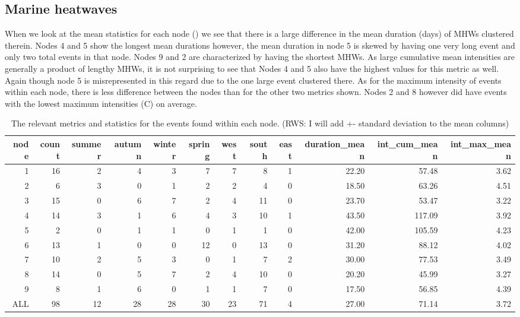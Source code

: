 \documentclass[a4paper,10pt,review]{elsarticle}
\begin{document}
\subsection{Marine heatwaves}
When we look at the mean statistics for each node () we see that there is a large difference in the mean duration (days) of MHWs clustered therein. Nodes 4 and 5 show the longest mean durations however, the mean duration in node 5 is skewed by having one very long event and only two total events in that node. Nodes 9 and 2 are characterized by having the shortest MHWs. As large cumulative mean intensities are generally a product of lengthy MHWs, it is not surprising to see that Nodes 4 and 5 also have the highest values for this metric as well. Again though node 5 is misrepresented in this regard due to the one large event clustered there. As for the maximum intensity of events within each node, there is less difference between the nodes than for the other two metrics shown. Nodes 2 and 8 however did have events with the lowest maximum intensities (\degree C) on average.

\begin{table}[ht]
\caption{\small The relevant metrics and statistics for the events found within each node. (RWS: I will add +- standard deviation to the mean columns)}
\label{table2}
\centering
\tiny
\begin{tabular}{rrrrrrrrrrrr}
  \toprule
node & count & summer & autumn & winter & spring & west & south & east & duration\_mean & int\_cum\_mean & int\_max\_mean \\ 
  \midrule
1 &  16 &   2 &   4 &   3 &   7 &   7 &   8 &   1 & 22.20 & 57.48 & 3.62 \\ 
  2 &   6 &   3 &   0 &   1 &   2 &   2 &   4 &   0 & 18.50 & 63.26 & 4.51 \\ 
  3 &  15 &   0 &   6 &   7 &   2 &   4 &  11 &   0 & 23.70 & 53.47 & 3.22 \\ 
  4 &  14 &   3 &   1 &   6 &   4 &   3 &  10 &   1 & 43.50 & 117.09 & 3.92 \\ 
  5 &   2 &   0 &   1 &   1 &   0 &   1 &   1 &   0 & 42.00 & 105.59 & 4.23 \\ 
  6 &  13 &   1 &   0 &   0 &  12 &   0 &  13 &   0 & 31.20 & 88.12 & 4.02 \\ 
  7 &  10 &   2 &   5 &   3 &   0 &   1 &   7 &   2 & 30.00 & 77.53 & 3.49 \\ 
  8 &  14 &   0 &   5 &   7 &   2 &   4 &  10 &   0 & 20.20 & 45.99 & 3.27 \\ 
  9 &   8 &   1 &   6 &   0 &   1 &   1 &   7 &   0 & 17.50 & 56.85 & 4.39 \\ 
  ALL &  98 &  12 &  28 &  28 &  30 &  23 &  71 &   4 & 27.00 & 71.14 & 3.72 \\ 
  \bottomrule
  \end{tabular}
\end{table}
\end{document}
